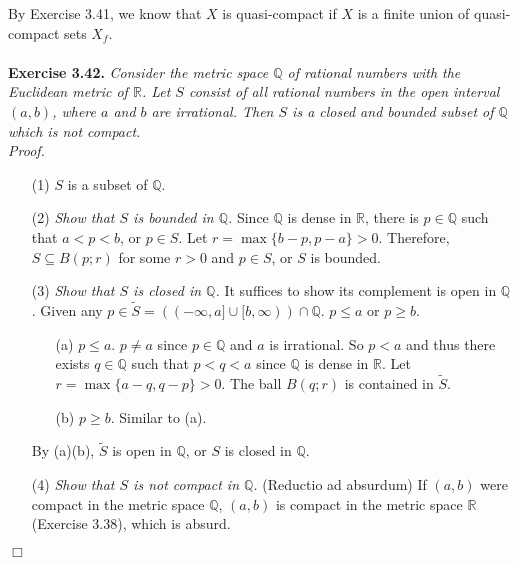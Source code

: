 \documentclass{article}
\begin{document}
By Exercise 3.41, we know that $X$ is quasi-compact if
$X$ is a finite union of quasi-compact sets $X_f$. \\\\






\textbf{Exercise 3.42.}
\emph{Consider the metric space $\mathbb{Q}$ of rational numbers with
the Euclidean metric of $\mathbb{R}$.
Let $S$ consist of all rational numbers in the open interval $(a,b)$,
where $a$ and $b$ are irrational.
Then $S$ is a closed and bounded subset of $\mathbb{Q}$ which is not compact.} \\

\emph{Proof.}
\begin{enumerate}
\item[(1)]
$S$ is a subset of $\mathbb{Q}$.
\item[(2)]
\emph{Show that $S$ is bounded in $\mathbb{Q}$.}
Since $\mathbb{Q}$ is dense in $\mathbb{R}$,
there is $p \in \mathbb{Q}$ such that $a < p < b$, or $p \in S$.
Let $r = \max\{b - p, p - a\} > 0$.
Therefore, $S \subseteq B(p; r)$ for some $r > 0$ and $p \in S$,
or $S$ is bounded.
\item[(3)]
\emph{Show that $S$ is closed in $\mathbb{Q}$.}
It suffices to show its complement is open in $\mathbb{Q}$.
Given any
$p \in \widetilde{S} = ((-\infty, a] \cup [b, \infty)) \cap \mathbb{Q}$.
$p \leq a$ or $p \geq b$.
  \begin{enumerate}
  \item[(a)]
  $p \leq a$. $p \neq a$ since $p \in \mathbb{Q}$ and $a$ is irrational.
  So $p < a$ and thus there exists $q \in \mathbb{Q}$ such that $p < q < a$
  since $\mathbb{Q}$ is dense in $\mathbb{R}$.
  Let $r = \max\{a - q, q - p\} > 0$.
  The ball $B(q; r)$ is contained in $\widetilde{S}$.
  \item[(b)]
  $p \geq b$. Similar to (a).
  \end{enumerate}
  By (a)(b), $\widetilde{S}$ is open in $\mathbb{Q}$, or $S$ is closed in $\mathbb{Q}$.
\item[(4)]
\emph{Show that $S$ is not compact in $\mathbb{Q}$.}
(Reductio ad absurdum)
If $(a,b)$ were compact in the metric space $\mathbb{Q}$,
$(a,b)$ is compact in the metric space $\mathbb{R}$ (Exercise 3.38),
which is absurd.
\end{enumerate}
$\Box$ \\\\
\end{document}
